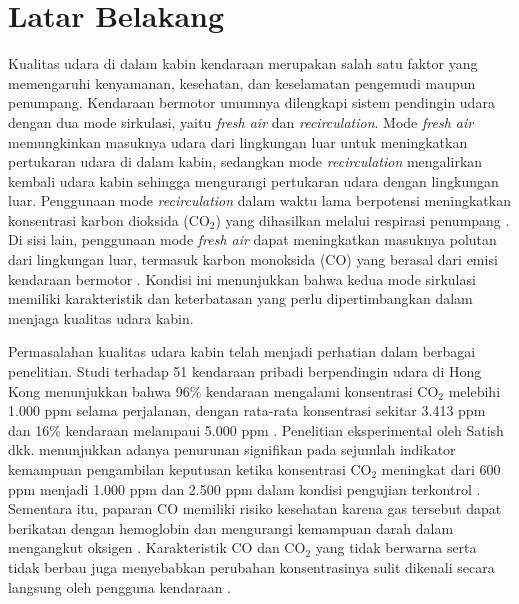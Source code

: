 \section{Latar Belakang}
\label{sec:Latar_Belakang}

    Kualitas udara di dalam kabin kendaraan merupakan salah satu faktor yang memengaruhi kenyamanan, kesehatan, dan keselamatan pengemudi maupun penumpang. Kendaraan bermotor umumnya dilengkapi sistem pendingin udara dengan dua mode sirkulasi, yaitu \textit{fresh air} dan \textit{recirculation}. Mode \textit{fresh air} memungkinkan masuknya udara dari lingkungan luar untuk meningkatkan pertukaran udara di dalam kabin, sedangkan mode \textit{recirculation} mengalirkan kembali udara kabin sehingga mengurangi pertukaran udara dengan lingkungan luar. Penggunaan mode \textit{recirculation} dalam waktu lama berpotensi meningkatkan konsentrasi karbon dioksida (CO$_2$) yang dihasilkan melalui respirasi penumpang \cite{barnes2018}. Di sisi lain, penggunaan mode \textit{fresh air} dapat meningkatkan masuknya polutan dari lingkungan luar, termasuk karbon monoksida (CO) yang berasal dari emisi kendaraan bermotor \cite{dirks2018}. Kondisi ini menunjukkan bahwa kedua mode sirkulasi memiliki karakteristik dan keterbatasan yang perlu dipertimbangkan dalam menjaga kualitas udara kabin.

Permasalahan kualitas udara kabin telah menjadi perhatian dalam berbagai penelitian. Studi terhadap 51 kendaraan pribadi berpendingin udara di Hong Kong menunjukkan bahwa 96\% kendaraan mengalami konsentrasi CO$_2$ melebihi 1.000 ppm selama perjalanan, dengan rata-rata konsentrasi sekitar 3.413 ppm dan 16\% kendaraan melampaui 5.000 ppm \cite{barnes2018}. Penelitian eksperimental oleh Satish dkk. menunjukkan adanya penurunan signifikan pada sejumlah indikator kemampuan pengambilan keputusan ketika konsentrasi CO$_2$ meningkat dari 600 ppm menjadi 1.000 ppm dan 2.500 ppm dalam kondisi pengujian terkontrol \cite{satish2012}. Sementara itu, paparan CO memiliki risiko kesehatan karena gas tersebut dapat berikatan dengan hemoglobin dan mengurangi kemampuan darah dalam mengangkut oksigen \cite{who_iaq}. Karakteristik CO dan CO$_2$ yang tidak berwarna serta tidak berbau juga menyebabkan perubahan konsentrasinya sulit dikenali secara langsung oleh pengguna kendaraan \cite{niosh_co,niosh_co2}.

